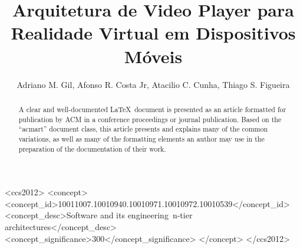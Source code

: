\documentclass[sigconf]{acmart}
\begin{document}
\title{Arquitetura de Video Player para Realidade Virtual em Dispositivos Móveis}

\author{Adriano M. Gil, Afonso R. Costa Jr, Atacilio C. Cunha, Thiago S. Figueira}


\renewcommand{\shortauthors}{Trovato and Tobin, et al.}

\begin{abstract}
  A clear and well-documented \LaTeX\ document is presented as an
  article formatted for publication by ACM in a conference proceedings
  or journal publication. Based on the ``acmart'' document class, this
  article presents and explains many of the common variations, as well
  as many of the formatting elements an author may use in the
  preparation of the documentation of their work.
\end{abstract}

\begin{CCSXML}
<ccs2012>
<concept>
<concept_id>10011007.10010940.10010971.10010972.10010539</concept_id>
<concept_desc>Software and its engineering~n-tier architectures</concept_desc>
<concept_significance>300</concept_significance>
</concept>
</ccs2012>
\end{CCSXML}

\end{document}
